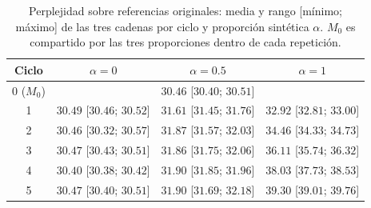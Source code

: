 
\begin{table}[ht]
\centering
\footnotesize
\begin{tabular}{c c c c}
\hline
Ciclo & $\alpha=0$ & $\alpha=0.5$ & $\alpha=1$ \\
\hline
0 ($M_0$) & \multicolumn{3}{c}{$30.46$ [$30.40$; $30.51$]} \\
1 & $30.49$ [$30.46$; $30.52$] & $31.61$ [$31.45$; $31.76$] & $32.92$ [$32.81$; $33.00$] \\
2 & $30.46$ [$30.32$; $30.57$] & $31.87$ [$31.57$; $32.03$] & $34.46$ [$34.33$; $34.73$] \\
3 & $30.47$ [$30.43$; $30.51$] & $31.86$ [$31.75$; $32.06$] & $36.11$ [$35.74$; $36.32$] \\
4 & $30.40$ [$30.38$; $30.42$] & $31.90$ [$31.85$; $31.96$] & $38.03$ [$37.73$; $38.53$] \\
5 & $30.47$ [$30.40$; $30.51$] & $31.90$ [$31.69$; $32.18$] & $39.30$ [$39.01$; $39.76$] \\
\hline
\end{tabular}
\caption{Perplejidad sobre referencias originales: media y rango [mínimo; máximo] de las tres cadenas por ciclo y proporción sintética $\alpha$. $M_0$ es compartido por las tres proporciones dentro de cada repetición.}
\label{tab:medias_human_perplexity}
\end{table}
